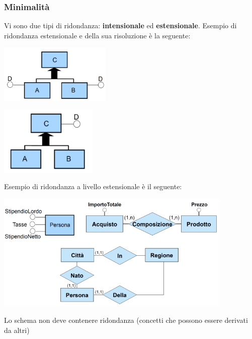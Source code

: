 \documentclass[12pt]{article}
\begin{document}
\subsubsection{Minimalità}
Vi sono due tipi di ridondanza: \textbf{intensionale} ed \textbf{estensionale}.
Esempio di ridondanza estensionale e della sua risoluzione è la seguente:
\begin{center}
    \includegraphics[width = 0.40\textwidth]{Images/72.PNG}
\end{center}
\begin{center}
    \includegraphics[width = 0.35\textwidth]{Images/73.PNG}
\end{center}
Esempio di ridondanza a livello estensionale è il seguente:
\begin{center}
    \includegraphics[width = 0.85\textwidth]{Images/74.PNG}
\end{center}
Lo schema non deve contenere ridondanza (concetti che possono essere derivati da altri)
\end{document}
